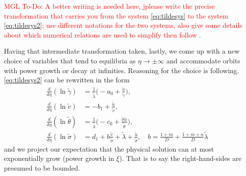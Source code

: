 \documentclass[a4paper,11pt]{article}
\def\tg{{\tilde{\gamma}}}
\def\tv{{\tilde{v}}}
\def\tth{{\tilde{\theta}}}
\def\ts{{\tilde{\sigma}}}
\def\tu{{\tilde{u}}}
\newcommand{\tcr}{\textcolor{red}}
\theoremstyle{remark}
\begin{document}
\noindent
\tcr{MGL To-Do:    A better writing is needed here, jplease write the precise transformation that carries you
 from the system \eqref{eq:tildesys} to the system \eqref{eq:tildesys2}; use different notations for the two systems,
 also give some details about which
 numerical relations are used to simplify then follow \cite{LKT17}. }

Having that intermediate transformation taken, lastly, we come up with a new choice of variables that tend to equilibria as $\eta \rightarrow \pm \infty$ and accommodate
orbits with power growth or decay at infinities. Reasoning for the choice is following. \eqref{eq:tildesys2} can be rewritten in the form
\begin{equation}
 \label{eq:tildesys3}
\begin{aligned}
\frac{d}{d\eta}{(\ln{\tg})}  &=  \tfrac{1}{\tilde\lambda} \big (- a_0 +  \frac{\tu}{\tg} \big ),
\\
\frac{d}{d\eta}{(\ln{\tv})}  &=  - b_1 + \frac{\tu}{\tv} ,
\\
\frac{d}{d\eta}{(\ln{\tth})} &=   \tfrac{1}{\tilde\lambda} \big (- c_0 +  \frac{\ts \tu}{\tth} \big ),
\\
\frac{d}{d\eta}{(\ln{\ts})} &= d_1 + b \frac{\tv}{\ts} + \tilde\lambda + \frac{\tu}{\ts}, \quad b = \frac{1+m}{D} + \frac{1+m+n}{D}\tilde\lambda
\end{aligned}
\end{equation}
and we project our expectation that the physical solution can at most exponentially grow (power growth in $\xi$). That is to say the right-hand-sides are presumed to be bounded.
\end{document}
